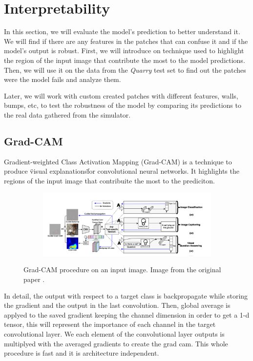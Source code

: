 \documentclass[../document.tex]{subfiles}
\begin{document}
\chapter{Interpretability}
\label{chap: interpretability}
In this section, we will evaluate the model's prediction to better understand it. We will find if there are any features in the patches that can confuse it and if the model's output is robust.
First, we will introduce on technique used to highlight the region of the input image that contribute the most to the model predictions. Then, we will use it on the data from the \emph{Quarry} test set to find out the patches were the model fails and analyze them.

Later, we will work with custom created patches with different features, walls, bumps, etc, to test the robustness of the model by comparing its predictions to the real data gathered from the simulator.

\section{Grad-CAM}
Gradient-weighted Class Activation Mapping (Grad-CAM) \cite{gradcam} is a technique to produce \"visual explanations\" for convolutional neural networks. It highlights the regions of the input image that contribuite the most to the prediciton. 
\begin{figure}[H]
    \centering
    \begin{subfigure}[b]{1\textwidth}
        \includegraphics[width=\linewidth]{../img/5/grad_cam1.png}
    \end{subfigure}
\caption{Grad-CAM procedure on an input image. Image from the original paper \cite{gradcam}.}
\end{figure}
In detail, the output with respect to a target class is backpropagate while storing the gradient and the output in the last convolution. Then, global average is applyed to the saved gradient keeping the channel dimension in order to get a 1-d tensor, this will represent the importance of each channel in the target convolutional layer. We  each element of the convolutional layer outputs is multiplyed with the averaged gradients to create the grad cam. This whole procedure is fast and it is architecture independent.
\end{document}
